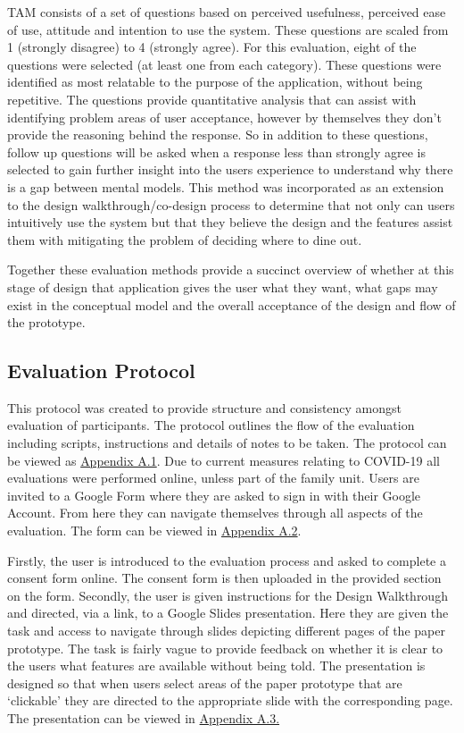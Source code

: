 \documentclass[a4 paper, 12pt]{article}
\begin{document}
TAM consists of a set of questions based on perceived usefulness, perceived ease of use, attitude and intention to use the system. These questions are scaled from 1 (strongly disagree) to 4 (strongly agree). For this evaluation, eight of the questions were selected (at least one from each category). These questions were identified as most relatable to the purpose of the application, without being repetitive. The questions provide quantitative analysis that can assist with identifying problem areas of user acceptance, however by themselves they don't provide the reasoning behind the response. So in addition to these questions, follow up questions will be asked when a response less than strongly agree is selected to gain further insight into the users experience to understand why there is a gap between mental models. This method was incorporated as an extension to the design walkthrough/co-design process to determine that not only can users intuitively use the system but that they believe the design and the features assist them with mitigating the problem of deciding where to dine out.

Together these evaluation methods provide a succinct overview of whether at this stage of design that application gives the user what they want, what gaps may exist in the conceptual model and the overall acceptance of the design and flow of the prototype.


\subsection{Evaluation Protocol}
This protocol was created to provide structure and consistency amongst evaluation of participants. The protocol outlines the flow of the evaluation including scripts, instructions and details of notes to be taken. The protocol can be viewed as \hyperref[sec:A.1]{Appendix A.1}. Due to current measures relating to COVID-19 all evaluations were performed online, unless part of the family unit. Users are invited to a Google Form where they are asked to sign in with their Google Account. From here they can navigate themselves through all aspects of the evaluation. The form can be viewed in \hyperref[sec:A.2]{Appendix A.2}.  

Firstly, the user is introduced to the evaluation process and asked to complete a consent form online. The consent form is then uploaded in the provided section on the form. Secondly, the user is given instructions for the Design Walkthrough and directed, via a link, to a Google Slides presentation. Here they are given the task and access to navigate through slides depicting different pages of the paper prototype. The task is fairly vague to provide feedback on whether it is clear to the users what features are available without being told. The presentation is designed so that when users select areas of the paper prototype that are ‘clickable’ they are directed to the appropriate slide with the corresponding page. The presentation can be viewed in \hyperref[sec:A.3]{Appendix A.3.}
\end{document}
